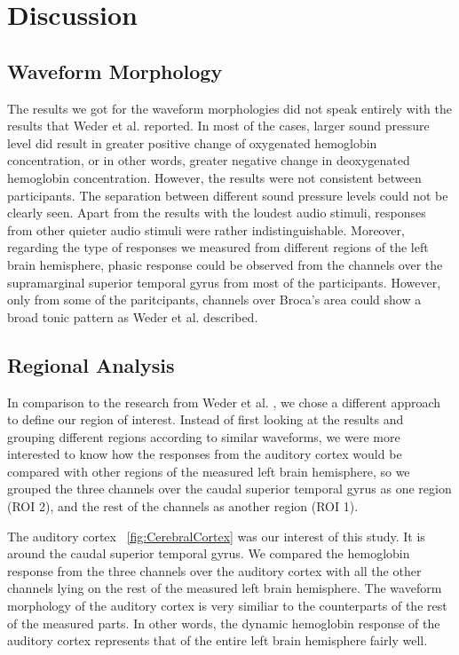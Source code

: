\chapter{Discussion}

\section{Waveform Morphology}
The results we got for the waveform morphologies did not speak entirely with the results that Weder et al. \citeyear{Weder2018} reported. In most of the cases, larger sound pressure level did result in greater positive change of oxygenated hemoglobin concentration, or in other words, greater negative change in deoxygenated hemoglobin concentration. However, the results were not consistent between participants. The separation between different sound pressure levels could not be clearly seen. Apart from the results with the loudest audio stimuli, responses from other quieter audio stimuli were rather indistinguishable. Moreover, regarding the type of responses we measured from different regions of the left brain hemisphere, phasic response could be observed from the channels over the supramarginal superior temporal gyrus from most of the participants. However, only from some of the paritcipants, channels over Broca's area could show a broad tonic pattern as Weder et al. \citeyear{Weder2018} described.

\section {Regional Analysis}
In comparison to the research from Weder et al. \citeyear{Weder2018}, we chose a different approach to define our region of interest. Instead of first looking at the results and grouping different regions according to similar waveforms, we were more interested to know how the responses from the auditory cortex would be compared with other regions of the measured left brain hemisphere, so we grouped the three channels over the caudal superior temporal gyrus as one region (ROI 2), and the rest of the channels as another region (ROI 1).

The auditory cortex ~\ref{fig:CerebralCortex} was our interest of this study. It is around the caudal superior temporal gyrus. We compared the hemoglobin response from the three channels over the auditory cortex with all the other channels lying on the rest of the measured left brain hemisphere. The waveform morphology of the auditory cortex is very similiar to the counterparts of the rest of the measured parts. In other words, the dynamic hemoglobin response of the auditory cortex represents that of the entire left brain hemisphere fairly well.

